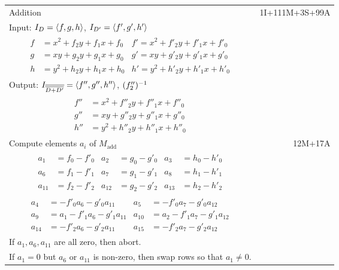 \setlength{\tempabovedisplayskip}{\abovedisplayskip}
\setlength{\tempbelowdisplayskip}{\belowdisplayskip}
\setlength{\abovedisplayskip}{-10pt}
\setlength{\belowdisplayskip}{-10pt}
\begin{tabularx}{\linewidth}{|Xr|}
  \hline
  Addition & 1I+111M+3S+99A \\
  Input: $I_D = \left\langle f, g, h \right\rangle$, $I_{D'} = \left\langle f',g',h' \right\rangle$ & \\
  {\begin{align*}
  f &= x^2 + f_2y + f_1x + f_0 & f' = x^2 + f'_2y + f'_1x + f'_0 \\
  g &=  xy + g_2y + g_1x + g_0 & g' =  xy + g'_2y + g'_1x + g'_0 \\
  h &= y^2 + h_2y + h_1x + h_0 & h' = y^2 + h'_2y + h'_1x + h'_0
  \end{align*}} & \\
  Output: $I_{\overline{\overline{D + D'}}} = \left\langle f'', g'', h'' \right\rangle$, $(f''_2)^{-1}$ & \\
  {\begin{align*}
  f'' &= x^2 + f''_2y + f''_1x + f''_0 \\
  g'' &=  xy + g''_2y + g''_1x + g''_0 \\
  h'' &= y^2 + h''_2y + h''_1x + h''_0
  \end{align*}} & \\
  \hline
  Compute elements $a_i$ of $M_{\text{add}}$ & 12M+17A \\
  \hline
  {\begin{align*}
    a_1    &= f_0 - f'_0 & a_2    &= g_0 - g'_0 & a_3    &= h_0 - h'_0 \\
    a_6    &= f_1 - f'_1 & a_7    &= g_1 - g'_1 & a_8    &= h_1 - h'_1 \\
    a_{11} &= f_2 - f'_2 & a_{12} &= g_2 - g'_2 & a_{13} &= h_2 - h'_2
  \end{align*}} & \\
  {\begin{align*}
    a_4    &=     - f'_0a_6 - g'_0a_{11} & a_5    &=     - f'_0a_7 - g'_0a_{12} \\
    a_9    &= a_1 - f'_1a_6 - g'_1a_{11} & a_{10} &= a_2 - f'_1a_7 - g'_1a_{12} \\
    a_{14} &=     - f'_2a_6 - g'_2a_{11} & a_{15} &=     - f'_2a_7 - g'_2a_{12}
  \end{align*}} & \\
  If $a_1, a_6, a_{11}$ are all zero, then abort. & \\
  If $a_1 = 0$ but $a_6$ or $a_{11}$ is non-zero, then swap rows so that $a_1 \neq 0$. & \\

\end{tabularx}
